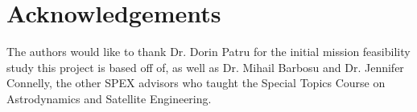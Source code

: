 \documentclass[conference]{IEEEtran} %
\begin{document}
\section*{Acknowledgements}
The authors would like to thank Dr. Dorin Patru for the initial mission feasibility study this project is based off of, as well as Dr. Mihail Barbosu and Dr. Jennifer Connelly, the other SPEX advisors who taught the Special Topics Course on Astrodynamics and Satellite Engineering.

\end{document}
